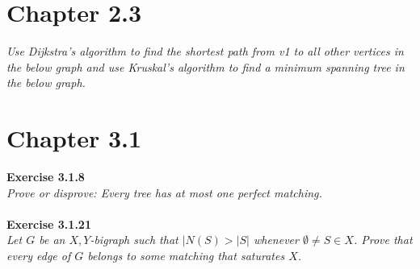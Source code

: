 \section{Chapter 2.3}
\textit{Use Dijkstra’s algorithm to find the shortest path from v1 to all other
	vertices in the below graph and use Kruskal’s algorithm to find a minimum
	spanning tree in the below graph.}
\section{Chapter 3.1}
\noindent
\textbf{Exercise 3.1.8}\\
\noindent
\textit{Prove or disprove: Every tree has at most one perfect matching.}
\\\\
\noindent
\textbf{Exercise 3.1.21}\\
\noindent
\textit{Let $G$ be an $X,Y$-bigraph such that $|N(S) > |S|$ whenever $\emptyset \ne S \in X$. Prove that every edge of $G$ belongs to some matching that saturates $X$.}


